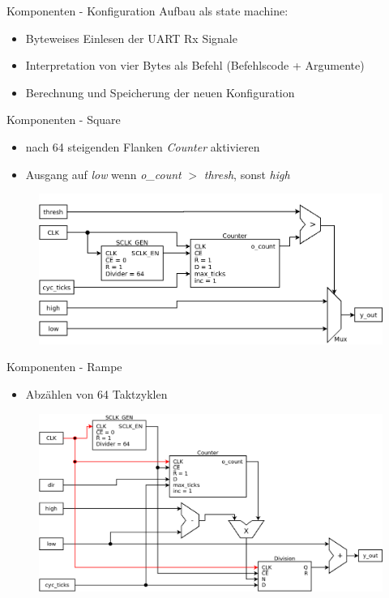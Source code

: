 \documentclass[11pt]{beamer}
\begin{document}
\begin{frame}{Komponenten - Konfiguration}
    Aufbau als state machine:
      \begin{itemize}
        \item Byteweises Einlesen der UART Rx Signale 
        \item Interpretation von vier Bytes als Befehl (Befehlscode + Argumente) 
        \item Berechnung und Speicherung der neuen Konfiguration
      \end{itemize}
      \resizebox{\textwidth}{!}{
      
}
\end{frame}

\begin{frame}{Komponenten - Square}
  \begin{itemize}
    \item nach 64 steigenden Flanken \emph{Counter} aktivieren
    \item Ausgang auf \emph{low} wenn \emph{o\_count} $>$ \emph{thresh}, sonst \emph{high} 
  \end{itemize}
  \begin{figure}
    \includegraphics[scale=0.28]{square}
  \end{figure}
\end{frame}

\begin{frame}{Komponenten - Rampe}
  \begin{itemize}
  \item  Abzählen von 64 Taktzyklen
  \end{itemize}
  \begin{figure}
    \includegraphics[scale=0.28]{ramp_step0}
  \end{figure}
\end{frame}
\end{document}
